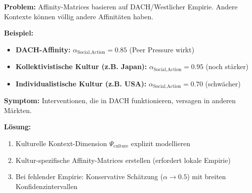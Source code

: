 \begin{tcolorbox}[colback=red!5!white, colframe=red!75!black,
    title=\textbf{Failure Mode 6: Out-of-Distribution Kontext}]

\textbf{Problem:} Affinity-Matrices basieren auf DACH/Westlicher Empirie. Andere Kontexte können völlig andere Affinitäten haben.

\medskip
\textbf{Beispiel:}
\begin{itemize}[nosep]
    \item \textbf{DACH-Affinity:} $\alpha_{\text{Social}, \text{Action}} = 0.85$ (Peer Pressure wirkt)
    \item \textbf{Kollektivistische Kultur (z.B. Japan):} $\alpha_{\text{Social}, \text{Action}} = 0.95$ (noch stärker)
    \item \textbf{Individualistische Kultur (z.B. USA):} $\alpha_{\text{Social}, \text{Action}} = 0.70$ (schwächer)
\end{itemize}

\medskip
\textbf{Symptom:} Interventionen, die in DACH funktionieren, versagen in anderen Märkten.

\textbf{Lösung:}
\begin{enumerate}[nosep]
    \item Kulturelle Kontext-Dimension $\Psi_{\text{culture}}$ explizit modellieren
    \item Kultur-spezifische Affinity-Matrices erstellen (erfordert lokale Empirie)
    \item Bei fehlender Empirie: Konservative Schätzung ($\alpha \rightarrow 0.5$) mit breiten Konfidenzintervallen
\end{enumerate}

\end{tcolorbox}

